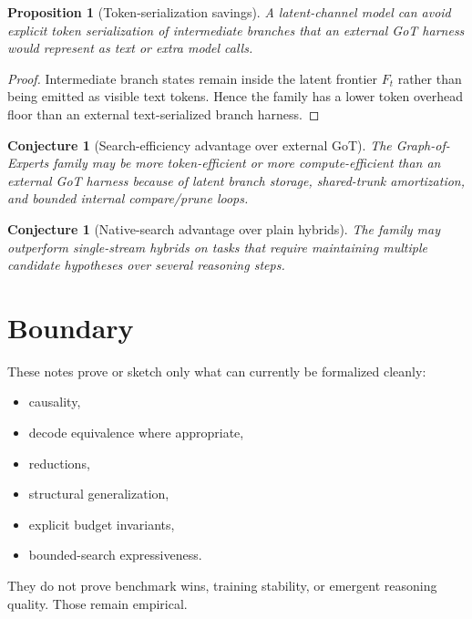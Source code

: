 \documentclass[11pt]{article}
\newtheorem{proposition}[definition]{Proposition}
\newtheorem{conjecture}[definition]{Conjecture}
\begin{document}
\begin{proposition}[Token-serialization savings]
A latent-channel model can avoid explicit token serialization of intermediate
branches that an external GoT harness would represent as text or extra model
calls.
\end{proposition}

\begin{proof}
Intermediate branch states remain inside the latent frontier $F_t$ rather than
being emitted as visible text tokens. Hence the family has a lower token
overhead floor than an external text-serialized branch harness.
\end{proof}

\begin{conjecture}[Search-efficiency advantage over external GoT]
The Graph-of-Experts family may be more token-efficient or more compute-efficient
than an external GoT harness because of latent branch storage,
shared-trunk amortization, and bounded internal compare/prune loops.
\end{conjecture}

\begin{conjecture}[Native-search advantage over plain hybrids]
The family may outperform single-stream hybrids on tasks that require
maintaining multiple candidate hypotheses over several reasoning steps.
\end{conjecture}

\section{Boundary}

These notes prove or sketch only what can currently be formalized cleanly:
\begin{itemize}
  \item causality,
  \item decode equivalence where appropriate,
  \item reductions,
  \item structural generalization,
  \item explicit budget invariants,
  \item bounded-search expressiveness.
\end{itemize}

They do not prove benchmark wins, training stability, or emergent reasoning
quality. Those remain empirical.
\end{document}
